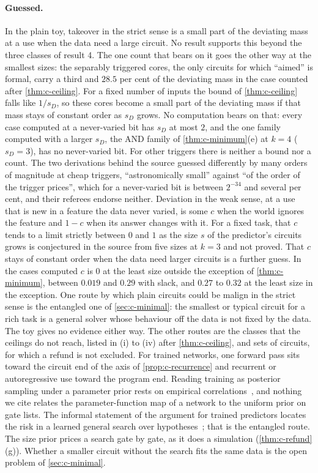 \paragraph{Guessed.} In the plain toy, takeover in the strict sense is a small part of the deviating mass at a
use when the data need a large circuit. No result supports this beyond the three classes of result 4. The
one count that
bears on it goes the other way at the smallest sizes: the separably triggered cores, the only circuits for
which ``aimed'' is formal, carry a third and $28.5$ per cent of the deviating mass in the case counted after
\cref{thm:c-ceiling}. For a fixed number of inputs the bound of \cref{thm:c-ceiling} falls like $1/s_D$, so
these cores become a small part of the deviating mass if that mass stays of constant order as $s_D$ grows. No
computation bears on that: every case computed at a never-varied bit has $s_D$ at most $2$, and the one
family computed with a larger $s_D$, the AND family of \cref{thm:c-minimum}(e) at $k=4$ ($s_D=3$), has no
never-varied bit. For other triggers there is neither a
bound nor a count. The two derivations behind the
source guessed differently by many orders of magnitude at cheap triggers, ``astronomically small'' against
``of the order of the trigger prices'', which for a never-varied bit is between $2^{-34}$ and several per
cent, and their referees endorse neither. Deviation in the weak sense, at a use that is new in a feature the
data never varied, is some $c$ when the world ignores the feature and $1-c$ when its answer changes with it.
For a fixed task, that $c$ tends to a limit strictly between $0$ and $1$ as the size $s$ of the predictor's
circuits grows is conjectured in the source from five sizes at $k=3$ and not proved. That $c$ stays of
constant order when the data need larger circuits is a further guess. In the cases computed $c$ is $0$ at the
least size outside the exception of \cref{thm:c-minimum}, between $0.019$ and $0.29$ with slack, and $0.27$ to
$0.32$ at the least size in the exception. One route by which plain circuits could be malign in the
strict sense is the entangled one of \cref{sec:c-minimal}: the smallest or typical circuit for a rich task is
a general solver whose behaviour off the data is not fixed by the data. The toy gives no evidence either way.
The other routes are the classes that the ceilings do not reach, listed in (i) to (iv) after
\cref{thm:c-ceiling}, and sets
of circuits, for which a refund is not excluded. For trained networks, one forward pass sits toward the
circuit end of the axis of \cref{prop:c-recurrence} and recurrent or autoregressive use toward the program
end. Reading training as posterior sampling under a parameter prior rests on empirical
correlations~\cite{mingard20}, and nothing we cite relates the parameter-function map of a network to the
uniform prior on gate lists. The informal statement of the argument for trained predictors locates the risk in
a learned general search over hypotheses~\cite[\S2.5]{hubinger23}; that is the entangled route. The size prior
prices a search gate by gate, as it does a simulation (\cref{thm:c-refund}(g)). Whether a smaller circuit
without the search fits the same data is the open problem of \cref{sec:c-minimal}.

